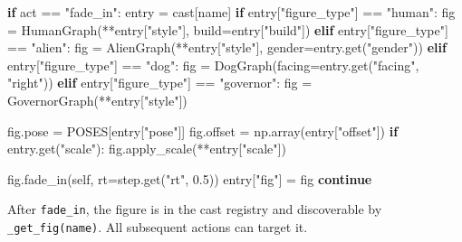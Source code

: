 \documentclass[
  11pt,
]{book}
\newenvironment{Shaded}{}{}
\newcommand{\ControlFlowTok}[1]{\textcolor[rgb]{0.00,0.44,0.13}{\textbf{#1}}}
\newcommand{\FloatTok}[1]{\textcolor[rgb]{0.25,0.63,0.44}{#1}}
\newcommand{\NormalTok}[1]{#1}
\newcommand{\OperatorTok}[1]{\textcolor[rgb]{0.40,0.40,0.40}{#1}}
\newcommand{\StringTok}[1]{\textcolor[rgb]{0.25,0.44,0.63}{#1}}
\newcommand{\VariableTok}[1]{\textcolor[rgb]{0.10,0.09,0.49}{#1}}
\begin{document}
\begin{Shaded}
\begin{Highlighting}[]
\ControlFlowTok{if}\NormalTok{ act }\OperatorTok{==} \StringTok{"fade\_in"}\NormalTok{:}
\NormalTok{    entry }\OperatorTok{=}\NormalTok{ cast[name]}
    \ControlFlowTok{if}\NormalTok{ entry[}\StringTok{"figure\_type"}\NormalTok{] }\OperatorTok{==} \StringTok{"human"}\NormalTok{:}
\NormalTok{        fig }\OperatorTok{=}\NormalTok{ HumanGraph(}\OperatorTok{**}\NormalTok{entry[}\StringTok{"style"}\NormalTok{], build}\OperatorTok{=}\NormalTok{entry[}\StringTok{"build"}\NormalTok{])}
    \ControlFlowTok{elif}\NormalTok{ entry[}\StringTok{"figure\_type"}\NormalTok{] }\OperatorTok{==} \StringTok{"alien"}\NormalTok{:}
\NormalTok{        fig }\OperatorTok{=}\NormalTok{ AlienGraph(}\OperatorTok{**}\NormalTok{entry[}\StringTok{"style"}\NormalTok{], gender}\OperatorTok{=}\NormalTok{entry.get(}\StringTok{"gender"}\NormalTok{))}
    \ControlFlowTok{elif}\NormalTok{ entry[}\StringTok{"figure\_type"}\NormalTok{] }\OperatorTok{==} \StringTok{"dog"}\NormalTok{:}
\NormalTok{        fig }\OperatorTok{=}\NormalTok{ DogGraph(facing}\OperatorTok{=}\NormalTok{entry.get(}\StringTok{"facing"}\NormalTok{, }\StringTok{"right"}\NormalTok{))}
    \ControlFlowTok{elif}\NormalTok{ entry[}\StringTok{"figure\_type"}\NormalTok{] }\OperatorTok{==} \StringTok{"governor"}\NormalTok{:}
\NormalTok{        fig }\OperatorTok{=}\NormalTok{ GovernorGraph(}\OperatorTok{**}\NormalTok{entry[}\StringTok{"style"}\NormalTok{])}

\NormalTok{    fig.pose }\OperatorTok{=}\NormalTok{ POSES[entry[}\StringTok{"pose"}\NormalTok{]]}
\NormalTok{    fig.offset }\OperatorTok{=}\NormalTok{ np.array(entry[}\StringTok{"offset"}\NormalTok{])}
    \ControlFlowTok{if}\NormalTok{ entry.get(}\StringTok{"scale"}\NormalTok{):}
\NormalTok{        fig.apply\_scale(}\OperatorTok{**}\NormalTok{entry[}\StringTok{"scale"}\NormalTok{])}

\NormalTok{    fig.fade\_in(}\VariableTok{self}\NormalTok{, rt}\OperatorTok{=}\NormalTok{step.get(}\StringTok{"rt"}\NormalTok{, }\FloatTok{0.5}\NormalTok{))}
\NormalTok{    entry[}\StringTok{"fig"}\NormalTok{] }\OperatorTok{=}\NormalTok{ fig}
    \ControlFlowTok{continue}
\end{Highlighting}
\end{Shaded}

After \texttt{fade\_in}, the figure is in the cast registry and
discoverable by \texttt{\_get\_fig(name)}. All subsequent actions can
target it.
\end{document}

